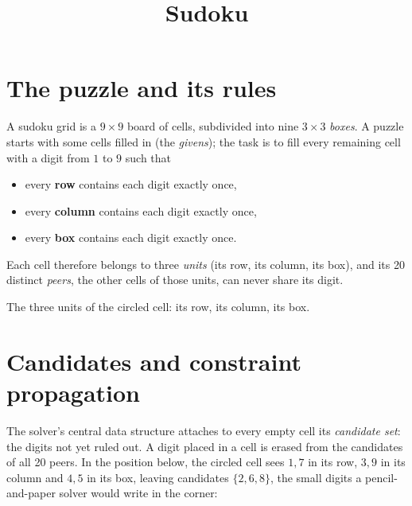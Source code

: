 \documentclass[11pt]{article}
\title{Sudoku}
\author{}
\date{}
\begin{document}
\maketitle
\thispagestyle{fancy}

\section{The puzzle and its rules}

A sudoku grid is a $9 \times 9$ board of cells, subdivided into nine
$3 \times 3$ \emph{boxes}. A puzzle starts with some cells filled in (the
\emph{givens}); the task is to fill every remaining cell with a digit from
$1$ to $9$ such that
\begin{itemize}
  \item every \textbf{row} contains each digit exactly once,
  \item every \textbf{column} contains each digit exactly once,
  \item every \textbf{box} contains each digit exactly once.
\end{itemize}
Each cell therefore belongs to three \emph{units} (its row, its column,
its box), and its 20 distinct \emph{peers}, the other cells of those
units, can never share its digit.

\begin{center}

\smallskip
The three units of the circled cell: its row, its column, its box.
\end{center}

\section{Candidates and constraint propagation}

The solver's central data structure attaches to every empty cell its
\emph{candidate set}: the digits not yet ruled out. A digit placed in a
cell is erased from the candidates of all 20 peers. In the position below,
the circled cell sees $1, 7$ in its row, $3, 9$ in its column and $4, 5$
in its box, leaving candidates $\{2, 6, 8\}$, the small digits a
pencil-and-paper solver would write in the corner:
\end{document}
